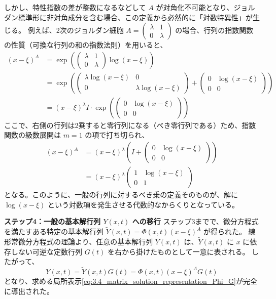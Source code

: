 \begin{Q}[係数行列 $P(x,t)$ が特異点 $x=\xi$ において高々1位の極（フックス型特異点）を持つと仮定したとき、基本解行列が局所表示 $Y(x,t) = \Phi(x,t)(x-\xi)^A G(t)$ を持つことは、具体的にどのように証明（構成）されるか？]
\begin{Q}
しかし、特性指数の差が整数になるなどして $A$ が対角化不可能となり、ジョルダン標準形に非対角成分を含む場合、この定義から必然的に「対数特異性」が生じる。
例えば、2次のジョルダン細胞 $A = \begin{pmatrix} \lambda & 1 \\ 0 & \lambda \end{pmatrix}$ の場合、行列の指数関数の性質（可換な行列の和の指数法則）を用いると、
\begin{align*}
  (x-\xi)^A &= \exp\left( \begin{pmatrix} \lambda & 1 \\ 0 & \lambda \end{pmatrix} \log(x-\xi) \right) \\
  &= \exp\left( \begin{pmatrix} \lambda \log(x-\xi) & 0 \\ 0 & \lambda \log(x-\xi) \end{pmatrix} + \begin{pmatrix} 0 & \log(x-\xi) \\ 0 & 0 \end{pmatrix} \right) \\
  &= (x-\xi)^\lambda I \cdot \exp\left( \begin{pmatrix} 0 & \log(x-\xi) \\ 0 & 0 \end{pmatrix} \right)
\end{align*}
ここで、右側の行列は2乗すると零行列になる（べき零行列である）ため、指数関数の級数展開は $m=1$ の項で打ち切られ、
\begin{align*}
  (x-\xi)^A &= (x-\xi)^\lambda \left( I + \begin{pmatrix} 0 & \log(x-\xi) \\ 0 & 0 \end{pmatrix} \right) \\
  &= (x-\xi)^\lambda \begin{pmatrix} 1 & \log(x-\xi) \\ 0 & 1 \end{pmatrix}
\end{align*}
となる。このように、一般の行列に対するべき乗の定義そのものが、解に $\log(x-\xi)$ という対数項を発生させる代数的なからくりとなっている。
\end{Q}

\textbf{ステップ4：一般の基本解行列 $Y(x,t)$ への移行}
ステップ3までで、微分方程式を満たすある特定の基本解行列 $\tilde{Y}(x,t) = \Phi(x,t)(x-\xi)^A$ が得られた。
線形常微分方程式の理論より、任意の基本解行列 $Y(x,t)$ は、$\tilde{Y}(x,t)$ に $x$ に依存しない可逆な定数行列 $G(t)$ を右から掛けたものとして一意に表される。
したがって、
\[
  Y(x,t) = \tilde{Y}(x,t)G(t) = \Phi(x,t)(x-\xi)^A G(t)
\]
となり、求める局所表示\eqref{eq:3.4_matrix_solution_representation_Phi_G}が完全に導出された。
\end{Q}

